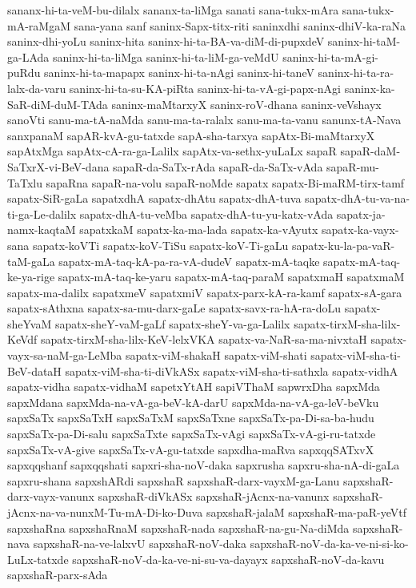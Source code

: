 {sananx-hi-ta-veM-bu-dilalx
sananx-ta-liMga
sanati
sana-tukx-mAra
sana-tukx-mA-raMgaM
sana-yana
sanf
saninx-Sapx-titx-riti
saninxdhi
saninx-dhiV-ka-raNa
saninx-dhi-yoLu
saninx-hita
saninx-hi-ta-BA-va-diM-di-pupxdeV
saninx-hi-taM-ga-LAda
saninx-hi-ta-liMga
saninx-hi-ta-liM-ga-veMdU
saninx-hi-ta-mA-gi-puRdu
saninx-hi-ta-mapapx
saninx-hi-ta-nAgi
saninx-hi-taneV
saninx-hi-ta-ra-lalx-da-varu
saninx-hi-ta-su-KA-piRta
saninx-hi-ta-vA-gi-papx-nAgi
saninx-ka-SaR-diM-duM-TAda
saninx-maMtarxyX
saninx-roV-dhana
saninx-veVshayx
sanoVti
sanu-ma-tA-naMda
sanu-ma-ta-ralalx
sanu-ma-ta-vanu
sanunx-tA-Nava
sanxpanaM
sapAR-kvA-gu-tatxde
sapA-sha-tarxya
sapAtx-Bi-maMtarxyX
sapAtxMga
sapAtx-cA-ra-ga-Lalilx
sapAtx-va-sethx-yuLaLx
sapaR
sapaR-daM-SaTxrX-vi-BeV-dana
sapaR-da-SaTx-rAda
sapaR-da-SaTx-vAda
sapaR-mu-TaTxlu
sapaRna
sapaR-na-volu
sapaR-noMde
sapatx
sapatx-Bi-maRM-tirx-tamf
sapatx-SiR-gaLa
sapatxdhA
sapatx-dhAtu
sapatx-dhA-tuva
sapatx-dhA-tu-va-na-ti-ga-Le-dalilx
sapatx-dhA-tu-veMba
sapatx-dhA-tu-yu-katx-vAda
sapatx-ja-namx-kaqtaM
sapatxkaM
sapatx-ka-ma-lada
sapatx-ka-vAyutx
sapatx-ka-vayx-sana
sapatx-koVTi
sapatx-koV-TiSu
sapatx-koV-Ti-gaLu
sapatx-ku-la-pa-vaR-taM-gaLa
sapatx-mA-taq-kA-pa-ra-vA-dudeV
sapatx-mA-taqke
sapatx-mA-taq-ke-ya-rige
sapatx-mA-taq-ke-yaru
sapatx-mA-taq-paraM
sapatxmaH
sapatxmaM
sapatx-ma-dalilx
sapatxmeV
sapatxmiV
sapatx-parx-kA-ra-kamf
sapatx-sA-gara
sapatx-sAthxna
sapatx-sa-mu-darx-gaLe
sapatx-savx-ra-hA-ra-doLu
sapatx-sheYvaM
sapatx-sheY-vaM-gaLf
sapatx-sheY-va-ga-Lalilx
sapatx-tirxM-sha-lilx-KeVdf
sapatx-tirxM-sha-lilx-KeV-lelxVKA
sapatx-va-NaR-sa-ma-nivxtaH
sapatx-vayx-sa-naM-ga-LeMba
sapatx-viM-shakaH
sapatx-viM-shati
sapatx-viM-sha-ti-BeV-dataH
sapatx-viM-sha-ti-diVkASx
sapatx-viM-sha-ti-sathxla
sapatx-vidhA
sapatx-vidha
sapatx-vidhaM
sapetxYtAH
sapiVThaM
sapwrxDha
sapxMda
sapxMdana
sapxMda-na-vA-ga-beV-kA-darU
sapxMda-na-vA-ga-leV-beVku
sapxSaTx
sapxSaTxH
sapxSaTxM
sapxSaTxne
sapxSaTx-pa-Di-sa-ba-hudu
sapxSaTx-pa-Di-salu
sapxSaTxte
sapxSaTx-vAgi
sapxSaTx-vA-gi-ru-tatxde
sapxSaTx-vA-give
sapxSaTx-vA-gu-tatxde
sapxdha-maRva
sapxqqSATxvX
sapxqqshanf
sapxqqshati
sapxri-sha-noV-daka
sapxrusha
sapxru-sha-nA-di-gaLa
sapxru-shana
sapxshARdi
sapxshaR
sapxshaR-darx-vayxM-ga-Lanu
sapxshaR-darx-vayx-vanunx
sapxshaR-diVkASx
sapxshaR-jAcnx-na-vanunx
sapxshaR-jAcnx-na-va-nunxM-Tu-mA-Di-ko-Duva
sapxshaR-jalaM
sapxshaR-ma-paR-yeVtf
sapxshaRna
sapxshaRnaM
sapxshaR-nada
sapxshaR-na-gu-Na-diMda
sapxshaR-nava
sapxshaR-na-ve-lalxvU
sapxshaR-noV-daka
sapxshaR-noV-da-ka-ve-ni-si-ko-LuLx-tatxde
sapxshaR-noV-da-ka-ve-ni-su-va-dayayx
sapxshaR-noV-da-kavu
sapxshaR-parx-sAda
}
